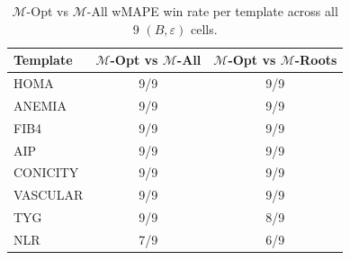 \begin{table}[t]
\centering\small
\caption{$\mathcal{M}$-Opt vs $\mathcal{M}$-All wMAPE win rate per template across all 9 $(B, \varepsilon)$ cells.}
\label{tab:agent_win_rate}
\begin{tabular}{lcc}
\toprule
Template & $\mathcal{M}$-Opt vs $\mathcal{M}$-All & $\mathcal{M}$-Opt vs $\mathcal{M}$-Roots \\
\midrule
HOMA & 9/9 & 9/9 \\
ANEMIA & 9/9 & 9/9 \\
FIB4 & 9/9 & 9/9 \\
AIP & 9/9 & 9/9 \\
CONICITY & 9/9 & 9/9 \\
VASCULAR & 9/9 & 9/9 \\
TYG & 9/9 & 8/9 \\
NLR & 7/9 & 6/9 \\
\bottomrule
\end{tabular}
\end{table}
